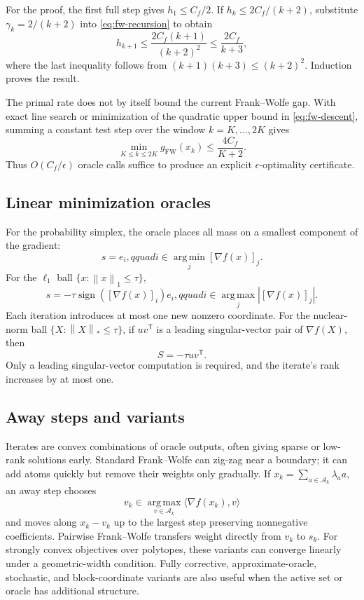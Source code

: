 \documentclass[12pt,oneside]{book}
\numberwithin{equation}{section}
\theoremstyle{definition}
\theoremstyle{plain}
\theoremstyle{remark}
\newcommand{\argmin}{\operatorname*{arg\,min}}
\newcommand{\argmax}{\operatorname*{arg\,max}}
\newcommand{\norm}[1]{\left\lVert #1 \right\rVert}
\newcommand{\abs}[1]{\left\lvert #1 \right\rvert}
\begin{document}
For the proof, the first full step gives $h_1\leq C_f/2$. If
$h_k\leq2C_f/(k+2)$, substitute $\gamma_k=2/(k+2)$ into
\eqref{eq:fw-recursion} to obtain
\[
 h_{k+1}\leq\frac{2C_f(k+1)}{(k+2)^2}
 \leq\frac{2C_f}{k+3},
\]
where the last inequality follows from
$(k+1)(k+3)\leq(k+2)^2$. Induction proves the result.

The primal rate does not by itself bound the current Frank--Wolfe gap. With
exact line search or minimization of the quadratic upper bound in
\eqref{eq:fw-descent}, summing a constant test step over the window
$k=K,\ldots,2K$ gives
\[
 \min_{K\leq k\leq2K}g_{\mathrm{FW}}(x_k)
 \leq\frac{4C_f}{K+2}.
\]
Thus $O(C_f/\epsilon)$ oracle calls suffice to produce an explicit
$\epsilon$-optimality certificate.

\subsection{Linear minimization oracles}

For the probability simplex, the oracle places all mass on a smallest
component of the gradient:
\[
 s=e_i,qquad i\in\argmin_j[\nabla f(x)]_j.
\]
For the $\ell_1$ ball $\{x:\norm{x}_1\leq\tau\}$,
\[
 s=-\tau\operatorname{sign}([\nabla f(x)]_i)e_i,qquad
 i\in\argmax_j\abs{[\nabla f(x)]_j}.
\]
Each iteration introduces at most one new nonzero coordinate. For the
nuclear-norm ball $\{X:\norm X_*\leq\tau\}$, if $uv^\mathsf T$ is a leading
singular-vector pair of $\nabla f(X)$, then
\[
 S=-\tau uv^\mathsf T.
\]
Only a leading singular-vector computation is required, and the iterate's
rank increases by at most one.

\subsection{Away steps and variants}

Iterates are convex combinations of oracle outputs, often giving sparse or
low-rank solutions early. Standard Frank--Wolfe can zig-zag near a boundary;
it can add atoms quickly but remove their weights only gradually. If
$x_k=\sum_{a\in\mathcal A_k}\lambda_a a$, an away step chooses
\[
 v_k\in\argmax_{v\in\mathcal A_k}\langle\nabla f(x_k),v\rangle
\]
and moves along $x_k-v_k$ up to the largest step preserving nonnegative
coefficients. Pairwise Frank--Wolfe transfers weight directly from $v_k$ to
$s_k$. For strongly convex objectives over polytopes, these variants can
converge linearly under a geometric-width condition. Fully corrective,
approximate-oracle, stochastic, and block-coordinate variants are also
useful when the active set or oracle has additional structure.
\end{document}
